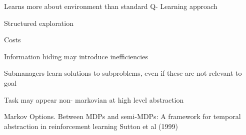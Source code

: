 \documentclass[english]{article}
\begin{document}
\item  Learns more about
environment than standard Q-
Learning approach
\item  Structured exploration

\eenum

Costs

\benum

\item   Information hiding may
introduce inefficiencies
\item   Submanagers learn solutions
to subproblems, even if these
are not relevant to goal
\item   Task may appear non-
markovian at high level
abstraction
\eenum


\eenum

\item Markov Options. Between MDPs and semi-MDPs: A framework for temporal
abstraction in reinforcement learning Sutton et al (1999)
\end{document}
